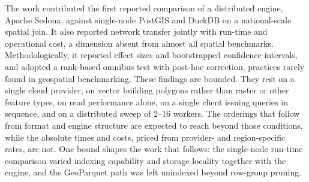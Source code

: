The work contributed the first reported comparison of a distributed engine, Apache Sedona, against single-node PostGIS and DuckDB on a national-scale spatial join. It also reported network transfer jointly with run-time and operational cost, a dimension absent from almost all spatial benchmarks. Methodologically, it reported effect sizes and bootstrapped confidence intervals, and adopted a rank-based omnibus test with post-hoc correction, practices rarely found in geospatial benchmarking. These findings are bounded. They rest on a single cloud provider, on vector building polygons rather than raster or other feature types, on read performance alone, on a single client issuing queries in sequence, and on a distributed sweep of 2--16 workers. The orderings that follow from format and engine structure are expected to reach beyond those conditions, while the absolute times and costs, priced from provider- and region-specific rates, are not. One bound shapes the work that follows: the single-node run-time comparison varied indexing capability and storage locality together with the engine, and the GeoParquet path was left unindexed beyond row-group pruning.